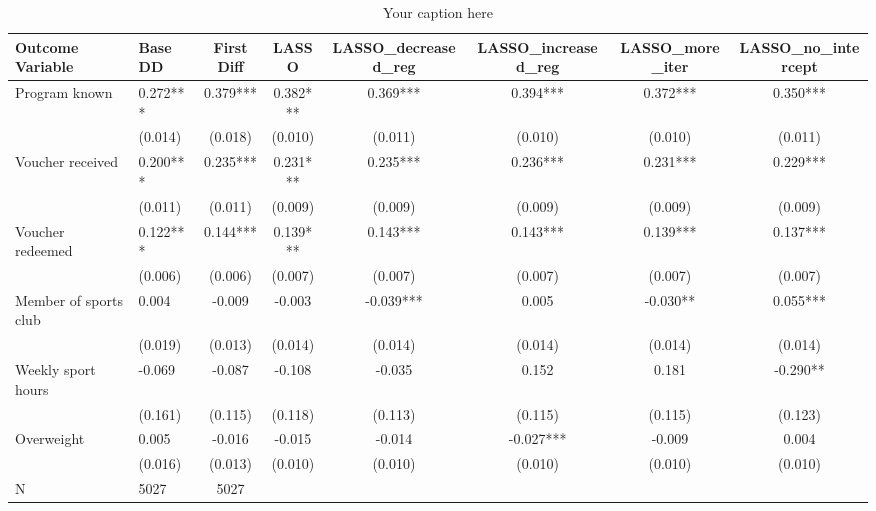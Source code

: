 \begin{sidewaystable*}
\centering
\begin{tabular}{llcccccc}
\hline
Outcome Variable & Base DD & First Diff & LASSO & LASSO_decreased_reg & LASSO_increased_reg & LASSO_more_iter & LASSO_no_intercept \\
\hline
Program known & 0.272*** & 0.379*** & 0.382*** & 0.369*** & 0.394*** & 0.372*** & 0.350*** \\
  & (0.014) & (0.018) & (0.010) & (0.011) & (0.010) & (0.010) & (0.011) \\
Voucher received & 0.200*** & 0.235*** & 0.231*** & 0.235*** & 0.236*** & 0.231*** & 0.229*** \\
  & (0.011) & (0.011) & (0.009) & (0.009) & (0.009) & (0.009) & (0.009) \\
Voucher redeemed & 0.122*** & 0.144*** & 0.139*** & 0.143*** & 0.143*** & 0.139*** & 0.137*** \\
  & (0.006) & (0.006) & (0.007) & (0.007) & (0.007) & (0.007) & (0.007) \\
Member of sports club & 0.004 & -0.009 & -0.003 & -0.039*** & 0.005 & -0.030** & 0.055*** \\
  & (0.019) & (0.013) & (0.014) & (0.014) & (0.014) & (0.014) & (0.014) \\
Weekly sport hours & -0.069 & -0.087 & -0.108 & -0.035 & 0.152 & 0.181 & -0.290** \\
  & (0.161) & (0.115) & (0.118) & (0.113) & (0.115) & (0.115) & (0.123) \\
Overweight & 0.005 & -0.016 & -0.015 & -0.014 & -0.027*** & -0.009 & 0.004 \\
  & (0.016) & (0.013) & (0.010) & (0.010) & (0.010) & (0.010) & (0.010) \\
\hline
N & 5027 & 5027  &  &  &  &  \\
\hline
\end{tabular}
\caption{Your caption here}
\label{tab:your_label}
\end{sidewaystable*}